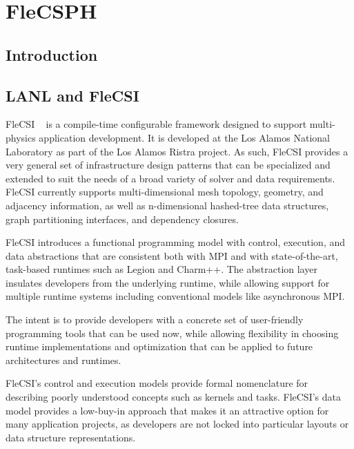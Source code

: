 \chapter{FleCSPH}

\section{Introduction}

\section{LANL and FleCSI}
FleCSI%
~\cite{bergen2016flexible} is a compile-time configurable framework designed to support multi-physics application development. 
It is developed at the Los Alamos National Laboratory as part of the Los Alamos Ristra project. 
As such, FleCSI provides a very general set of infrastructure design patterns that can be specialized and extended to suit the needs of a broad variety of solver and data requirements. 
FleCSI currently supports multi-dimensional mesh topology, geometry, and adjacency information, as well as n-dimensional hashed-tree data structures, graph partitioning interfaces, and dependency closures.

FleCSI introduces a functional programming model with control, execution, and data abstractions that are consistent both with MPI and with state-of-the-art, task-based runtimes such as Legion\cite{bauer2012legion} and Charm++\cite{kale1993charm++}. 
The abstraction layer insulates developers from the underlying runtime, while allowing support for multiple runtime systems including conventional models like asynchronous MPI.

The intent is to provide developers with a concrete set of user-friendly programming tools that can be used now, while allowing flexibility in choosing runtime implementations and optimization that can be applied to future architectures and runtimes.

FleCSI's control and execution models provide formal nomenclature for describing poorly understood concepts such as kernels and tasks. 
FleCSI's data model provides a low-buy-in approach that makes it an attractive option for many application projects, as developers are not locked into particular layouts or data structure representations.

